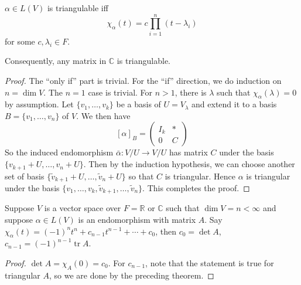 \begin{theorem}
    $\alpha\in L(V)$ is triangulable iff
    $$\chi_\alpha(t)=c\prod_{i=1}^n(t-\lambda_i)$$
    for some $c,\lambda_i\in F$.
\end{theorem}
Consequently, any matrix in $\mathbb C$ is triangulable.
\begin{proof}
    The ``only if'' part is trivial.
    For the ``if'' direction, we do induction on $n=\dim V$.
    The $n=1$ case is trivial.
    For $n>1$, there is $\lambda$ such that $\chi_\alpha(\lambda)=0$ by assumption.
    Let $\{v_1,\ldots,v_k\}$ be a basis of $U=V_\lambda$ and extend it to a basis $B=\{v_1,\ldots,v_n\}$ of $V$.
    We then have
    $$[\alpha]_B=\left( \begin{array}{c|c}
        I_k&\ast\\ \hline
        0&C
    \end{array} \right)$$
    So the induced endomorphism $\bar\alpha:V/U\to V/U$ has matrix $C$ under the basis $\{v_{k+1}+U,\ldots,v_n+U\}$.
    Then by the induction hypothesis, we can choose another set of basis $\{\tilde{v}_{k+1}+U,\ldots,\tilde{v}_n+U\}$ so that $C$ is triangular.
    Hence $\alpha$ is triangular under the basis $\{v_1,\ldots,v_k,\tilde{v}_{k+1},\ldots,\tilde{v}_n\}$.
    This completes the proof.
\end{proof}
\begin{lemma}
    Suppose $V$ is a vector space over $F=\mathbb R$ or $\mathbb C$ such that $\dim V=n<\infty$ and suppose $\alpha\in L(V)$ is an endomorphism with matrix $A$.
    Say $\chi_\alpha(t)=(-1)^nt^n+c_{n-1}t^{n-1}+\cdots+c_0$, then $c_0=\det A$, $c_{n-1}=(-1)^{n-1}\operatorname{tr}A$.
\end{lemma}
\begin{proof}
    $\det A=\chi_A(0)=c_0$.
    For $c_{n-1}$, note that the statement is true for triangular $A$, so we are done by the preceding theorem.
\end{proof}
